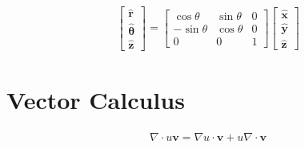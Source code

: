 \begin{align}
\begin{bmatrix}\mathbf{\hat r} \\ \boldsymbol{\hat\theta} \\ \mathbf{\hat z}\end{bmatrix}
  = \begin{bmatrix} \cos\theta & \sin\theta & 0 \\
                   -\sin\theta & \cos\theta & 0 \\
                   0 & 0 & 1 \end{bmatrix}
    \begin{bmatrix} \mathbf{\hat x} \\ \mathbf{\hat y} \\ \mathbf{\hat z} \end{bmatrix}	
\end{align}

\section{Vector Calculus}

\begin{align}
\nabla\cdot u\textbf{v} = \nabla u\cdot\textbf{v} + u\nabla\cdot\textbf{v}
\end{align}
